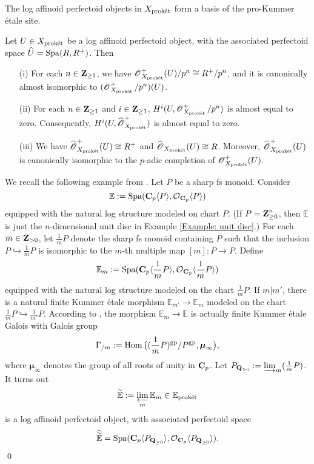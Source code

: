 \begin{Proposition}
The log affinoid perfectoid objects in $X_{\operatorname{\textrm{prok\'{e}t}}}$ form a basis of the pro-Kummer \'etale site.
\end{Proposition}

\begin{Proposition}\label{Proposition: almost vanishing}
Let $U\in X_{\operatorname{\textrm{prok\'{e}t}}}$ be a log affinoid perfectoid object, with the associated perfectoid space $\widehat{U}=\operatorname{Spa}(R, R^+)$. Then
\begin{enumerate}
\item[(i)] For each $n\in \operatorname{\mathbf{Z}}_{\geq 1}$, we have $\operatorname{\mathscr{O}}^+_{X_{\operatorname{\textrm{prok\'{e}t}}}}(U)/p^n\cong R^+/p^n$, and it is canonically almost isomorphic to $(\operatorname{\mathscr{O}}^+_{X_{\operatorname{\textrm{prok\'{e}t}}}}/p^n)(U)$.
\item[(ii)] For each $n\in \operatorname{\mathbf{Z}}_{\geq 1}$ and $i\in \operatorname{\mathbf{Z}}_{\geq 1}$, $H^i(U, \operatorname{\mathscr{O}}^+_{X_{\operatorname{\textrm{prok\'{e}t}}}}/p^n)$ is almost equal to zero. Consequently, $H^i(U, \widehat{\operatorname{\mathscr{O}}}^+_{X_{\operatorname{\textrm{prok\'{e}t}}}})$ is almost equal to zero.
\item[(iii)] We have $\widehat{\operatorname{\mathscr{O}}}^+_{X_{\operatorname{\textrm{prok\'{e}t}}}}(U)\cong R^+$ and $\widehat{\operatorname{\mathscr{O}}}_{X_{\operatorname{\textrm{prok\'{e}t}}}}(U)\cong R$. Moreover, $\widehat{\operatorname{\mathscr{O}}}^+_{X_{\operatorname{\textrm{prok\'{e}t}}}}(U)$ is canonically isomorphic to the $p$-adic completion of $\operatorname{\mathscr{O}}^+_{X_{\operatorname{\textrm{prok\'{e}t}}}}(U)$.
\end{enumerate}
\end{Proposition}

\begin{Example}\label{Example: basic example of profinite Galois cover}
\normalfont We recall the following example from \cite[\S 6]{Diao}. Let $P$ be a sharp fs monoid. Consider
\[\mathbb{E}:=\operatorname{Spa}(\operatorname{\mathbf{C}}_p\langle P\rangle, \operatorname{\mathcal{O}}_{\operatorname{\mathbf{C}}_p}\langle P\rangle)\]
equipped with the natural log structure modeled on chart $P$. (If $P=\operatorname{\mathbf{Z}}_{\geq 0}^n$, then $\mathbb{E}$ is just the $n$-dimensional unit disc in Example \ref{Example: unit disc}.) For each $m\in \operatorname{\mathbf{Z}}_{>0}$, let $\frac{1}{m}P$ denote the sharp fs monoid containing $P$ such that the inclusion $P\hookrightarrow \frac{1}{m}P$ is isomorphic to the $m$-th multiple map $[m]:P\rightarrow P$. Define
\[\mathbb{E}_m:=\operatorname{Spa}(\operatorname{\mathbf{C}}_p\langle \frac{1}{m}P\rangle, \operatorname{\mathcal{O}}_{\operatorname{\mathbf{C}}_p}\langle \frac{1}{m}P\rangle)\]
equipped with the natural log structure modeled on the chart $\frac{1}{m}P$.  If $m|m'$, there is a natural finite Kummer \'etale morphism $\mathbb{E}_{m'}\rightarrow \mathbb{E}_{m}$ modeled on the chart $\frac{1}{m}P\hookrightarrow \frac{1}{m'}P$. According to \cite[Proposition 4.1.6]{Diao}, the morphism $\mathbb{E}_m\rightarrow \mathbb{E}$ is actually finite Kummer \'etale Galois with Galois group 
$$
\Gamma_{/m}:=\operatorname{Hom}\big((\frac{1}{m}P)^{\mathrm{gp}}/P^{\mathrm{gp}}, \boldsymbol{\mu}_{\infty}\big),
$$
where $\boldsymbol{\mu}_{\infty}$ denotes the group of all roots of unity in $\operatorname{\mathbf{C}}_p$. Let $P_{\operatorname{\mathbf{Q}}_{\geq 0}}:=\varinjlim_m (\frac{1}{m}P)$. It turns out
\[\widetilde{\mathbb{E}}:=\varprojlim_m \mathbb{E}_m\in \mathbb{E}_{\operatorname{\textrm{prok\'{e}t}}}\] is a log affinoid perfectoid object, with associated perfectoid space
\[\widehat{\widetilde{\mathbb{E}}}=\operatorname{Spa}(\operatorname{\mathbf{C}}_p\langle P_{\operatorname{\mathbf{Q}}_{\geq 0}}\rangle, \operatorname{\mathcal{O}}_{\operatorname{\mathbf{C}}_p}\langle P_{\operatorname{\mathbf{Q}}_{\geq 0}}\rangle).\]\qed
\end{Example}

